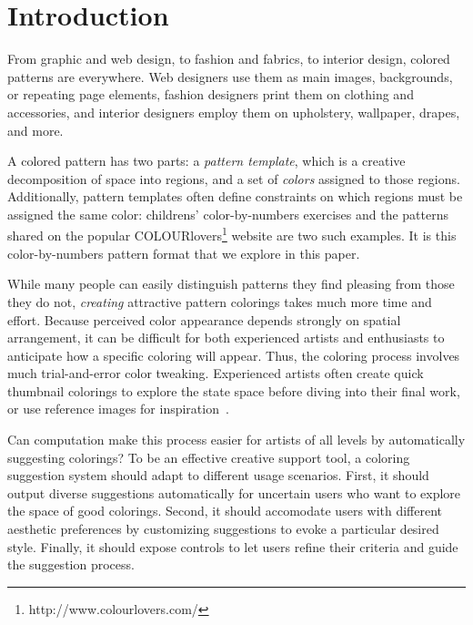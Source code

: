 \section{Introduction}
\label{sec:introduction}

From graphic and web design, to fashion and fabrics, to interior design, colored patterns are everywhere. Web designers use them as main images, backgrounds, or repeating page elements, fashion designers print them on clothing and accessories, and interior designers employ them on upholstery, wallpaper, drapes, and more.

A colored pattern has two parts: a \emph{pattern template}, which is a creative decomposition of space into regions, and a set of \emph{colors} assigned to those regions.
Additionally, pattern templates often define constraints on which regions must be assigned the same color: childrens' color-by-numbers exercises and the patterns shared on the popular COLOURlovers\footnote{http://www.colourlovers.com/} website are two such examples. It is this color-by-numbers pattern format that we explore in this paper.

While many people can easily distinguish patterns they find pleasing from those they do not, \emph{creating} attractive pattern colorings takes much more time and effort. Because perceived color appearance depends strongly on spatial arrangement, it can be difficult for both experienced artists and enthusiasts to anticipate how a specific coloring will appear. Thus, the coloring process involves much trial-and-error color tweaking. Experienced artists often create quick thumbnail colorings to explore the state space before diving into their final work, or use reference images for inspiration~\cite{ColorPaletteTools}.

Can computation make this process easier for artists of all levels by automatically suggesting colorings? To be an effective creative support tool, a coloring suggestion system should adapt to different usage scenarios. First, it should output diverse suggestions automatically for uncertain users who want to explore the space of good colorings. Second, it should accomodate users with different aesthetic preferences by customizing suggestions to evoke a particular desired style. Finally, it should expose controls to let users refine their criteria and guide the suggestion process. 

